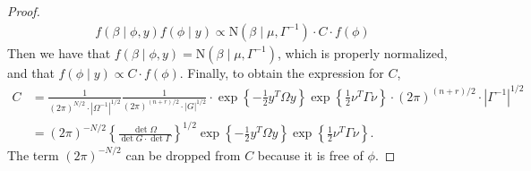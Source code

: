 \documentclass[10pt]{article}
\begin{document}
\begin{proof}
%
\begin{align*}
f(\beta \mid \phi, y) f(\phi \mid y) \propto \text{N}(\beta \mid \mu, \Gamma^{-1}) \cdot C \cdot f(\phi)
\end{align*}
%
Then we have that $f(\beta \mid \phi, y) = \text{N}(\beta \mid \mu, \Gamma^{-1})$, which is properly normalized, and that $f(\phi \mid y) \propto C \cdot f(\phi)$. Finally, to obtain the expression for $C$,
%
\begin{align*}
C &= \frac{1}{ (2\pi)^{N/2} \cdot |\Omega^{-1}|^{1/2}}
\frac{1}{ (2\pi)^{(n+r)/2} \cdot |G|^{1/2}} \cdot \exp\left\{ -\frac{1}{2} y^T \Omega y \right\} \exp\left\{ \frac{1}{2} \nu^T \Gamma \nu \right\} \cdot (2\pi)^{(n+r)/2} \cdot |\Gamma^{-1}|^{1/2} \\
&= (2\pi)^{-N/2} \left\{ \frac{ \det \Omega }{\det G \cdot \det \Gamma} \right\}^{1/2}
\exp\left\{ -\frac{1}{2} y^T \Omega y \right\} \exp\left\{ \frac{1}{2} \nu^T \Gamma \nu \right\}.
\end{align*}
%
The term $(2\pi)^{-N/2}$ can be dropped from $C$ because it is free of $\phi$.

\end{proof}




%
\end{document}
